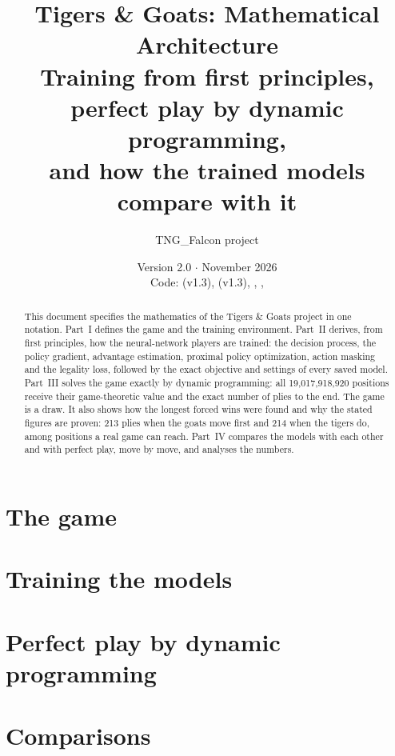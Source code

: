 \documentclass[11pt]{article}
\title{\textbf{Tigers \& Goats: Mathematical Architecture}\\[0.4em]
\large Training from first principles, perfect play by dynamic programming,\\ and how the trained models compare with it}
\author{TNG\_Falcon project}
\date{Version 2.0 \quad$\cdot$\quad 15 November 2026\\[0.3em]
\normalsize Code: \code{env\_tng.py} (v1.3), \code{TnG\_Notebook.ipynb} (v1.3), \code{train.py}, \code{perfect\_play/}, \code{tngviz/}}
\theoremstyle{plain}
\theoremstyle{definition}
\theoremstyle{remark}
\begin{document}
\maketitle

\begin{abstract}
\noindent This document specifies the mathematics of the Tigers \& Goats project in one notation. Part~I defines the game
and the training environment. Part~II derives, from first principles, how the neural-network players are
trained: the decision process, the policy gradient, advantage estimation, proximal policy optimization, action
masking and the legality loss, followed by the exact objective and settings of every saved model. Part~III
solves the game exactly by dynamic programming: all 19{,}017{,}918{,}920 positions receive their
game-theoretic value and the exact number of plies to the end. The game is a draw. It also shows how the
longest forced wins were found and why the stated figures are proven: 213 plies when the goats move first and
214 when the tigers do, among positions a real game can reach. Part~IV compares the models with each other
and with perfect play, move by move, and analyses the numbers.
\end{abstract}

\tableofcontents
\newpage




\part{The game}


\part{Training the models}






\part{Perfect play by dynamic programming}



\part{Comparisons}



\end{document}
